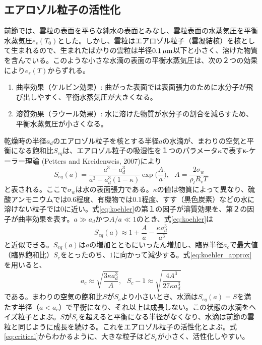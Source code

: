 \documentclass{ltjsarticle}
\begin{document}
\subsection{エアロゾル粒子の活性化}\label{sec:activation}
前節では、雲粒の表面を平らな純水の表面とみなし、雲粒表面の水蒸気圧を平衡水蒸気圧$e_{s}(T_{0})$とした。しかし、雲粒はエアロゾル粒子（雲凝結核）を核として生まれるので、生まれたばかりの雲粒は半径$0.1\,\rm \mu m$以下と小さく、溶けた物質を含んでいる。このような小さな水滴の表面の平衡水蒸気圧は、次の２つの効果により$e_{s}(T)$からずれる。
\begin{enumerate}
\item 曲率効果（ケルビン効果）: 曲がった表面では表面張力のために水分子が飛び出しやすく、平衡水蒸気圧が大きくなる。
\item 溶質効果（ラウール効果）: 水に溶けた物質が水分子の割合を減らすため、平衡水蒸気圧が小さくなる。
\end{enumerate}
乾燥時の半径$a_{d}$のエアロゾル粒子を核とする半径$a$の水滴が、まわりの空気と平衡になる飽和比$S_{eq}$は、エアロゾル粒子の吸湿性を１つのパラメータ$\kappa$で表すκ-ケーラー理論 (Petters and Kreidenweis, 2007)により
\begin{equation}\label{eq:koehler}
S_{eq}(a) = \frac{a^{3}-a_{d}^{3}}{a^{3}-a_{d}^{3}(1-\kappa)}\exp{\bigg (}\frac{A}{a}{\bigg )},\ \ \ A=\frac{2\sigma_{w}}{\rho_{l}R_{v}T}
\end{equation}
と表される。ここで$\sigma_{w}$は水の表面張力である。$\kappa$の値は物質によって異なり、硫酸アンモニウムでは$0.6$程度、有機物では$0.1$程度、すす（黒色炭素）などの水に溶けない粒子では$0$に近い。式\eqref{eq:koehler}の第１の因子が溶質効果を、第２の因子が曲率効果を表す。$a \gg a_{d}$かつ$A/a \ll 1$のとき、式\eqref{eq:koehler}は
\begin{equation}\label{eq:koehler_approx}
S_{eq}(a) \approx 1+\frac{A}{a}-\frac{\kappa a_{d}^{3}}{a^{3}}
\end{equation}
と近似できる。$S_{eq}(a)$は$a$の増加とともにいったん増加し、臨界半径$a_{c}$で最大値（臨界飽和比）$S_{c}$をとったのち、$1$に向かって減少する。式\eqref{eq:koehler_approx}を用いると、
\begin{equation}\label{eq:critical}
a_{c}\approx\sqrt{\frac{3\kappa a_{d}^{3}}{A}},\ \ \ S_{c}-1\approx\sqrt{\frac{4A^{3}}{27\kappa a_{d}^{3}}}
\end{equation}
である。まわりの空気の飽和比$S$が$S_{c}$より小さいとき、水滴は$S_{eq}(a)=S$を満たす半径（$a<a_{c}$）で平衡になり、それ以上は成長しない。この状態の水滴をヘイズ粒子とよぶ。$S$が$S_{c}$を超えると平衡になる半径がなくなり、水滴は前節の雲粒と同じように成長を続ける。これをエアロゾル粒子の活性化とよぶ。式\eqref{eq:critical}からわかるように、大きな粒子ほど$S_{c}$が小さく、活性化しやすい。
\end{document}
